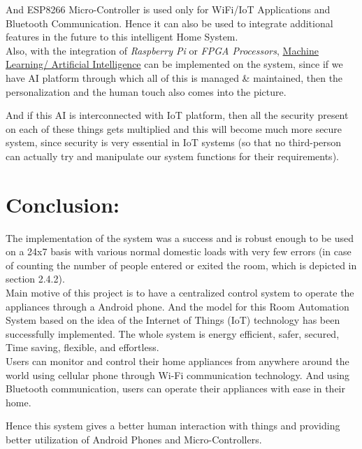\documentclass[11pt,a4paper]{article}
\begin{document}
And ESP8266 Micro-Controller is used only for WiFi/IoT Applications and Bluetooth Communication. Hence it can also be used to integrate additional features in the future to this intelligent Home System.\\

Also, with the integration of \textit{Raspberry Pi} or \textit{FPGA Processors}, \uline{Machine Learning/ Artificial Intelligence} can be implemented on the system, since if we have AI platform through which all of this is managed \& maintained, then the personalization and the human touch also comes into the picture. 

And if this AI is interconnected with IoT platform, then all the security present on each of these things gets multiplied and this will become much more secure system, since security is very essential in IoT systems (so that no third-person can actually try and manipulate our system functions for their requirements).

\section{Conclusion:}

The implementation of the system was a success and is robust enough to be used on a 24x7 basis with various normal domestic loads with very few errors (in case of counting the number of people entered or exited the room, which is depicted in section 2.4.2).\\

Main motive of this project is to have a centralized control system to operate the appliances
through a Android phone. And the model for this Room Automation System based on the idea of the Internet of Things (IoT) technology has been successfully implemented. The whole system is energy efficient, safer, secured, Time saving, flexible, and effortless.\\ 

Users can monitor and control their home appliances from anywhere around the world using cellular phone through Wi-Fi communication technology. And using Bluetooth communication, users can operate their appliances with ease in their home. 

Hence this system gives a better human interaction with things and providing better utilization of Android Phones and Micro-Controllers.\\
\end{document}
